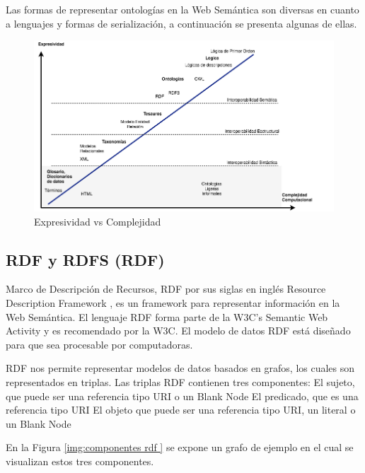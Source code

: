 Las formas de representar ontologías en la Web Semántica son diversas en cuanto a lenguajes y formas de serialización, a continuación se presenta algunas de ellas.

    \begin{figure}[ht!]
    \centering
    \includegraphics[width=150mm]{figuras/Diagramas-ComplejidadOntologica}
    \caption{Expresividad vs Complejidad}
    \label{img:expresividad complejidad }
    \end{figure}



\subsection{RDF y RDFS (RDF)}

Marco de Descripción de Recursos, RDF por sus siglas en inglés Resource Description Framework \cite{rdf}, es un framework para representar información en la Web Semántica. El lenguaje RDF forma parte de la W3C's Semantic Web Activity y es recomendado por la W3C. El modelo de datos RDF está diseñado para que sea procesable por computadoras. 

RDF nos permite representar modelos de datos basados en grafos, los cuales son representados en triplas. Las triplas RDF contienen tres componentes:
El sujeto, que puede ser una referencia tipo URI o un Blank Node
El predicado, que es una referencia tipo URI
El objeto que puede ser una referencia tipo URI, un literal o un Blank Node

En la Figura \ref{img:componentes rdf } se expone un grafo de ejemplo en el cual se visualizan estos tres componentes.

